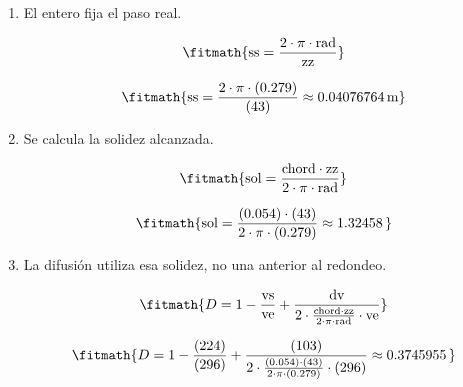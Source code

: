 \begin{enumerate}

\item El entero fija el paso real.

\[\fitmath{\mathrm{ss}=\frac{2\cdot \pi\cdot \mathrm{rad}}{\mathrm{zz}}}\]

\[\fitmath{\mathrm{ss}=\frac{2\cdot \pi\cdot (0.279)}{(43)}\approx 0.04076764\,\mathrm{m}}\]

\item Se calcula la solidez alcanzada.

\[\fitmath{\mathrm{sol}=\frac{\mathrm{chord}\cdot \mathrm{zz}}{2\cdot \pi\cdot \mathrm{rad}}}\]

\[\fitmath{\mathrm{sol}=\frac{(0.054)\cdot (43)}{2\cdot \pi\cdot (0.279)}\approx 1.32458\,}\]

\item La difusión utiliza esa solidez, no una anterior al redondeo.

\[\fitmath{D=1-\frac{\mathrm{vs}}{\mathrm{ve}}+\frac{\mathrm{dv}}{2\cdot \frac{\mathrm{chord}\cdot \mathrm{zz}}{2\cdot \pi\cdot \mathrm{rad}}\cdot \mathrm{ve}}}\]

\[\fitmath{D=1-\frac{(224)}{(296)}+\frac{(103)}{2\cdot \frac{(0.054)\cdot (43)}{2\cdot \pi\cdot (0.279)}\cdot (296)}\approx 0.3745955\,}\]

\end{enumerate}
